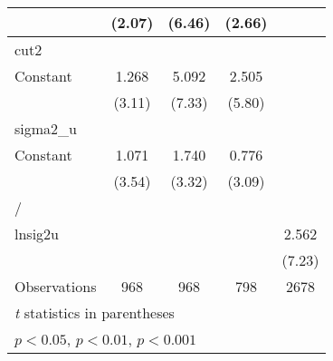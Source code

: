 {\begin{tabular}{l*{4}{c}}
                    &      (2.07)         &      (6.46)         &      (2.66)         &                     \\
\hline
cut2                &                     &                     &                     &                     \\
Constant            &       1.268\sym{**} &       5.092\sym{***}&       2.505\sym{***}&                     \\
                    &      (3.11)         &      (7.33)         &      (5.80)         &                     \\
\hline
sigma2\_u            &                     &                     &                     &                     \\
Constant            &       1.071\sym{***}&       1.740\sym{***}&       0.776\sym{**} &                     \\
                    &      (3.54)         &      (3.32)         &      (3.09)         &                     \\
\hline
/                   &                     &                     &                     &                     \\
lnsig2u             &                     &                     &                     &       2.562\sym{***}\\
                    &                     &                     &                     &      (7.23)         \\
\hline
Observations        &         968         &         968         &         798         &        2678         \\
\hline\hline
\multicolumn{5}{l}{\footnotesize \textit{t} statistics in parentheses}\\
\multicolumn{5}{l}{\footnotesize \sym{*} \(p<0.05\), \sym{**} \(p<0.01\), \sym{***} \(p<0.001\)}\\
\end{tabular}
}
